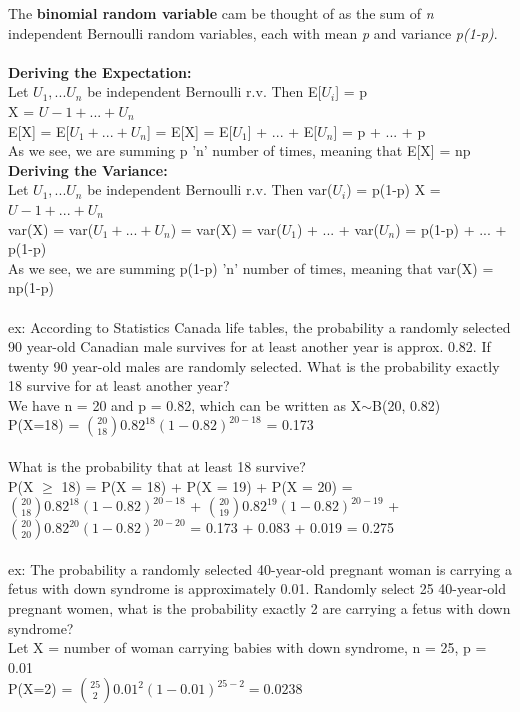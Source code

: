 \documentclass[12pt, a4paper]{article}
\begin{document}
	The \textbf{binomial random variable} cam be thought of as the sum of \textit{n} independent Bernoulli random variables, each with mean \textit{p} and variance \textit{p(1-p)}. \\~\\
	\noindent \textbf{Deriving the Expectation:} \\
	Let $U_1,...U_n$ be independent Bernoulli r.v. Then E[$U_i$] = p \\
	X = $U-1+...+U_n$ \\ E[X] = E[$U_1+...+U_n$] = E[X] = E[$U_1$] + ... + E[$U_n$] = p + ... + p \\
	As we see, we are summing p 'n' number of times, meaning that E[X] = np \newpage
	\noindent \textbf{Deriving the Variance:} \\
	Let $U_1,...U_n$ be independent Bernoulli r.v. Then var($U_i$) = p(1-p)
	X = $U-1+...+U_n$ \\ var(X) = var($U_1+...+U_n$) = var(X) = var($U_1$) + ... + var($U_n$) = p(1-p) + ... + p(1-p) \\
	As we see, we are summing p(1-p) 'n' number of times, meaning that var(X) = np(1-p) \\~\\	
	ex: According to Statistics Canada life tables, the probability a randomly selected 90 year-old Canadian male survives for at least another year is approx. 0.82. If twenty 90 year-old males are randomly selected. What is the probability exactly 18 survive for at least another year? \\
	We have n = 20 and p = 0.82, which can be written as X$\sim$B(20, 0.82) \\
	P(X=18) = $\binom{20}{18}0.82^{18}(1-0.82)^{20-18}$ = 0.173 \\~\\
	What is the probability that at least 18 survive? \\
	P(X $\geq$ 18) = P(X = 18) + P(X = 19) + P(X = 20) = $\binom{20}{18}0.82^{18}(1-0.82)^{20-18}$ + $\binom{20}{19}0.82^{19}(1-0.82)^{20-19}$ + $\binom{20}{20}0.82^{20}(1-0.82)^{20-20}$ = 0.173 + 0.083 + 0.019 = 0.275 \\~\\
	ex: The probability a randomly selected 40-year-old pregnant woman is carrying a fetus with down syndrome is approximately 0.01. Randomly select 25 40-year-old pregnant women, what is the probability exactly 2 are carrying a fetus with down syndrome?\\
	Let X = number of woman carrying babies with down syndrome, n = 25, p = 0.01 \\ P(X=2) = $\binom{25}{2}0.01^{2}(1-0.01)^{25-2} = 0.0238$ \\~\\
\end{document}
